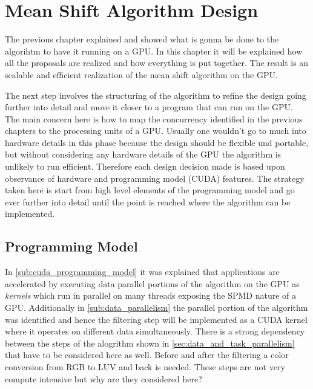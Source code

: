 
\chapter{Mean Shift Algorithm Design} %
\label{cha:algorithm_design}
The previous chapter explained and showed what is gonna be done to the algorihtm
to have it running on a \gls{GPU}. In this chapter it will be explained how all
the proposals are realized and how everything is put together. The result is an
scalable and efficient realization of the mean shift algorithm on the \gls{GPU}.

The next step involves the structuring of the algorithm to refine the design
going further into detail and move it closer to a program that can run on the
\gls{GPU}. The main concern here is how to map the concurrency identified in the
previous chapters to the processing units of a \gls{GPU}. Usually one wouldn't
go to much into hardware details in this phase because the design should be
flexible und portable, but without considering any hardware details of the
\gls{GPU} the algorithm is unlikely to run efficient. Therefore each design
decision made is based upon observance of hardware and programming model
(\gls{CUDA}) features. The strategy taken here is start from high level elements
of the programming model and go ever further into detail until the point is reached
where the algorithm can be implemented. 

\section{Programming Model} %
\label{sec:cuda_kernels}

In \autoref{sub:cuda_programming_model} it was explained that applications are
accelerated by executing data parallel portions of the algorithm on the
\gls{GPU} as \emph{kernels} which run in parallel on many threads exposing the
\gls{SPMD} nature of a \gls{GPU}. Additionally in \autoref{sub:data_parallelism}
the parallel portion of the algorithm was identified and hence the filtering
step will be implemented as a \gls{CUDA} kernel where it operates on different
data simultaneously. There is a strong dependency between the steps of the 
alogrithm shown in \autoref{sec:data_and_task_parallelism} that have to be 
considered here as well. Before and after the filtering a color conversion from
\gls{RGB} to \gls{LUV} and back is needed. These steps are not very compute 
intensive but why are they considered here?

